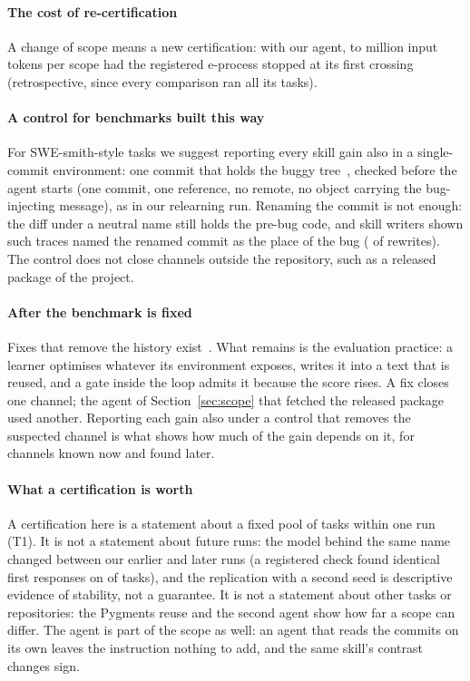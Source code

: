 \documentclass[sigconf,review,anonymous]{acmart}
\begin{document}
\paragraph{The cost of re-certification}
A change of scope means a new certification: with our agent, \ntokAdmitLo{} to \ntokAdmitHi{}
million input tokens per scope had the registered e-process stopped at its first crossing
(retrospective, since every comparison ran all its tasks).

\paragraph{A control for benchmarks built this way}
For SWE-smith-style tasks we suggest reporting every skill gain also in a single-commit environment:
one commit that holds the buggy tree~\cite{debuggym_swesmith_git_fix}, checked before the agent
starts (one commit, one reference, no remote, no object carrying the bug-injecting message), as in
our relearning run. Renaming the commit is not enough: the diff under a neutral name still holds
the pre-bug code, and skill writers shown such traces named the renamed commit as the place of the
bug (\nwrRenNamed{} of \nwrRenN{} rewrites). The control does not close channels outside the
repository, such as a released package of the project.

\paragraph{After the benchmark is fixed}
Fixes that remove the history exist~\cite{swebench_git_log_fix,debuggym_swesmith_git_fix}. What
remains is the evaluation practice: a learner optimises whatever its environment exposes, writes it
into a text that is reused, and a gate inside the loop admits it because the score rises. A fix
closes one channel; the agent of Section~\ref{sec:scope} that fetched the released package used
another. Reporting each gain also under a control that removes the suspected channel is what
shows how much of the gain depends on it, for channels known now and found later.

\paragraph{What a certification is worth}
A certification here is a statement about a fixed pool of tasks within one run (T1). It is not a
statement about future runs: the model behind the same name changed between our earlier and later
runs (a registered check found identical first responses on \ndriftMatch{} of \ndriftTasks{} tasks),
and the replication with a second seed is descriptive evidence of stability, not a guarantee. It is
not a statement about other tasks or repositories: the Pygments reuse and the second agent show how
far a scope can differ. The agent is part of the scope as well: an agent that reads the commits on
its own leaves the instruction nothing to add, and the same skill's contrast changes sign.
\end{document}
